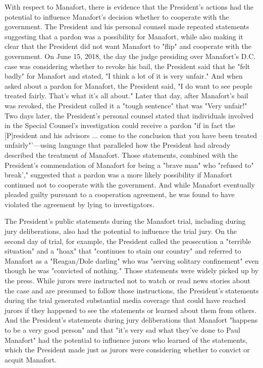 With respect to Manafort, there is evidence that the President's actions had the potential to influence Manafort's decision whether to cooperate with the government.
The President and his personal counsel made repeated statements suggesting that a pardon was a possibility for Manafort, while also making it clear that the President did not want Manafort to "flip" and cooperate with the government.
On June 15, 2018, the day the judge presiding over Manafort's D.C. case was considering whether to revoke his bail, the President said that he "felt badly" for Manafort and stated, "I think a lot of it is very unfair."
And when asked about a pardon for Manafort, the President said, "I do want to see people treated fairly.
That's what it's all about." Later that day, after Manafort's bail was revoked, the President called it a "tough sentence" that was "Very unfair!"
Two days later, the President's personal counsel stated that individuals involved in the Special Counsel's investigation could receive a pardon "if in fact the [P]resident and his advisors ... come to the conclusion that you have been treated unfairly"'—using language that paralleled how the President had already described the treatment of Manafort.
Those statements, combined with the President's commendation of Manafort for being a "brave man" who "refused to" break'," suggested that a pardon was a more likely possibility if Manafort continued not to cooperate with the government.
And while Manafort eventually pleaded guilty pursuant to a cooperation agreement, he was found to have violated the agreement by lying to investigators.

The President's public statements during the Manafort trial, including during jury deliberations, also had the potential to influence the trial jury.
On the second day of trial, for example, the President called the prosecution a "terrible situation" and a "hoax" that "continues to stain our country" and referred to Manafort as a "Reagan/Dole darling" who was "serving solitary confinement" even though he was "convicted of nothing."
Those statements were widely picked up by the press.
While jurors were instructed not to watch or read news stories about the case and are presumed to follow those instructions, the President's statements during the trial generated substantial media coverage that could have reached jurors if they happened to see the statements or learned about them from others.
And the President's statements during jury deliberations that Manafort "happens to be a very good person" and that "it's very sad what they've done to Paul Manafort" had the potential to influence jurors who learned of the statements, which the President made just as jurors were considering whether to convict or acquit Manafort.

